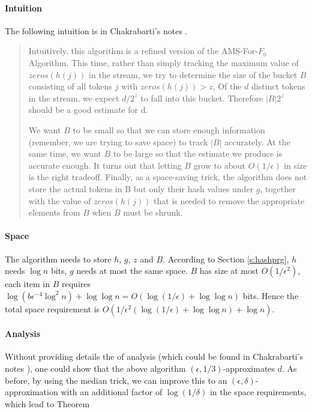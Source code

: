 \documentclass[11pt]{article}
\theoremstyle{plain}
\begin{document}
\paragraph{Intuition} The following intuition is in Chakrabarti's 
notes  \cite{Cha2015-notes}.
\begin{quotation}
	Intuitively, this algorithm is a refined version of the AMS-For-$F_0$ 
	Algorithm. This time, rather than simply tracking the maximum value of 
	$zeros(h(j))$ in the stream, we try to determine the size of the bucket $B$ 
	consisting of all tokens $j$ with $zeros(h(j)) > z$, Of the $d$ distinct 
	tokens in the stream, we expect $d/2^z$ to fall into this bucket.
	Therefore $|B|2^{z}$ should be a good estimate for d.
	
	We want $B$ to be small so that we can store enough information 
	(remember, we are trying to save space) to track
	$|B|$ accurately. At the same time, we want $B$ to be large so that the 
	estimate we produce is accurate enough. It turns
	out that letting $B$ grow to about $O(1/\epsilon)$ in size is the right 
	tradeoff. Finally, as a space-saving trick, the algorithm does not store the 
	actual tokens in B but only their hash values under $g$, together with the 
	value of $zeros(h(j))$ that is needed to remove the appropriate elements 
	from $B$ when $B$ must be shrunk.
\end{quotation}

\paragraph{Space}
The algorithm needs to store $h$, $g$, $z$ and $B$. According to 
Section  \ref{s:hashprg}, $h$ needs $\log n$ bits, $g$ needs at most the 
same space. $B$ has size at most $O(1/\epsilon^2)$, each item in $B$ 
requires $\log (b\epsilon^{-4}\log^2 n)+\log\log n=O(\log(1/\epsilon)+\log\log 
n)$ bits. Hence the total space requirement is 
$O(1/\epsilon^2(\log(1/\epsilon)+\log\log n)+\log n)$. 

\paragraph{Analysis} Without providing details the of analysis (which could 
be found in Chakrabarti's 
notes  \cite{Cha2015-notes}), one could show that the above algorithm 
$(\epsilon,1/3)$-approximates $d$. As before, by using the median trick, we 
can improve this to an $(\epsilon,\delta)$-approximation with an additional 
factor of $\log(1/\delta)$ in the space requirements, which lead to Theorem~
\end{document}
